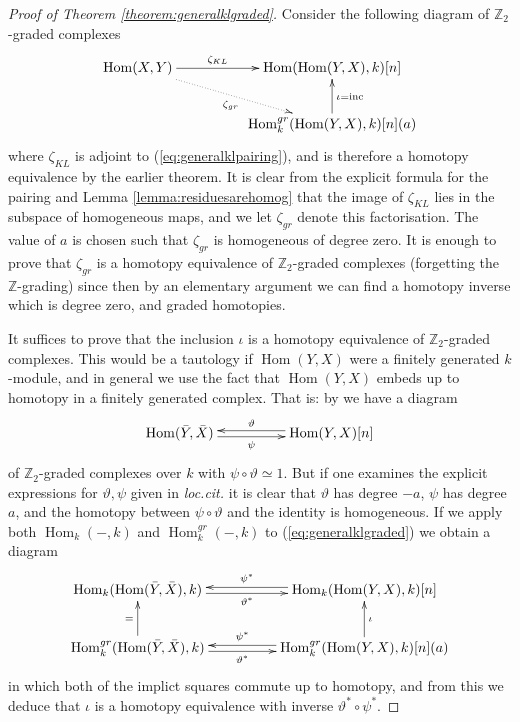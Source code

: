 \documentclass{compositio}
\theoremstyle{definition}
\numberwithin{equation}{section}
\def\inc{\operatorname{inc}}
\def\Hom{\operatorname{Hom}}
\begin{document}
\begin{proof}[Proof of Theorem \ref{theorem:generalklgraded}]
Consider the following diagram of $\mathbb{Z}_2$-graded complexes
\[
\xymatrix@C+2pc{
\Hom(X,Y) \ar@{.>}[dr]_-{\zeta_{gr}} \ar[r]^-{\zeta_{KL}} & \Hom(\Hom(Y,X),k)[n]\\
& \Hom^{gr}_k( \Hom(Y,X), k)[n](a) \ar[u]_{\iota = \inc}
}
\]
where $\zeta_{KL}$ is adjoint to (\ref{eq:generalklpairing}), and is therefore a homotopy equivalence by the earlier theorem. It is clear from the explicit formula for the pairing and Lemma \ref{lemma:residuesarehomog} that the image of $\zeta_{KL}$ lies in the subspace of homogeneous maps, and we let $\zeta_{gr}$ denote this factorisation. The value of $a$ is chosen such that $\zeta_{gr}$ is homogeneous of degree zero. It is enough to prove that $\zeta_{gr}$ is a homotopy equivalence of $\mathbb{Z}_2$-graded complexes (forgetting the $\mathbb{Z}$-grading) since then by an elementary argument we can find a homotopy inverse which is degree zero, and graded homotopies.

It suffices to prove that the inclusion $\iota$ is a homotopy equivalence of $\mathbb{Z}_2$-graded complexes. This would be a tautology if $\Hom(Y,X)$ were a finitely generated $k$-module, and in general we use the fact that $\Hom(Y,X)$ embeds up to homotopy in a finitely generated complex. That is: by \cite[Section ??]{blah} we have a diagram
\begin{equation}\label{eq:generalklgraded}
\xymatrix@C+2pc{
\Hom(\bar{Y}, \bar{X}) \ar@<-0.5ex>[r]_-{\psi} & \Hom(Y,X)[n] \ar@<-0.5ex>[l]_-{\vartheta}
}
\end{equation}
of $\mathbb{Z}_2$-graded complexes over $k$ with $\psi \circ \vartheta \simeq 1$. But if one examines the explicit expressions for $\vartheta, \psi$ given in \emph{loc.cit.} it is clear that $\vartheta$ has degree $-a$, $\psi$ has degree $a$, and the homotopy between $\psi \circ \vartheta$ and the identity is homogeneous. If we apply both $\Hom_k(-,k)$ and $\Hom_k^{gr}(-,k)$ to (\ref{eq:generalklgraded}) we obtain a diagram
\[
\xymatrix@C+2pc{
\Hom_k( \Hom(\bar{Y}, \bar{X}), k ) \ar@<-0.5ex>[r]_-{\vartheta^*} & \Hom_k(\Hom(Y,X),k)[n] \ar@<-0.5ex>[l]_-{\psi^*}\\
\Hom_k^{gr}(\Hom(\bar{Y}, \bar{X}), k) \ar[u]^{=} \ar@<-0.5ex>[r]_-{\vartheta^*} & \Hom_k^{gr}(\Hom(Y,X),k)[n](a) \ar@<-0.5ex>[l]_-{\psi^*} \ar[u]_{\iota}
}
\]
in which both of the implict squares commute up to homotopy, and from this we deduce that $\iota$ is a homotopy equivalence with inverse $\vartheta^* \circ \psi^*$.
\end{proof}
\end{document}

